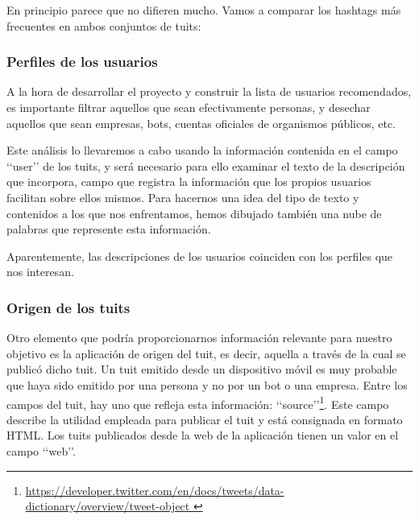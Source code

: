 En principio parece que no difieren mucho. Vamos a comparar los hashtags más frecuentes
en ambos conjuntos de tuits:


\subsubsection{Perfiles de los usuarios}
A la hora de desarrollar el proyecto y construir la lista de usuarios recomendados, es importante
filtrar aquellos que sean efectivamente personas, y desechar aquellos que sean empresas, bots, cuentas
oficiales de organismos públicos, etc.

Este análisis lo llevaremos a cabo usando la información contenida en el campo \lq\lq user\rq\rq
de los tuits, y será necesario para ello examinar el texto de la descripción que incorpora, campo que
registra la información que los propios usuarios facilitan sobre ellos mismos. 
Para hacernos una idea del tipo de texto y contenidos a los que nos enfrentamos, hemos dibujado también
una nube de palabras que represente esta información.




Aparentemente, las descripciones de los usuarios coinciden con los perfiles que nos interesan.

\subsubsection{Origen de los tuits}
\label{subsubsect:origen_tuits}
Otro elemento que podría proporcionarnos información relevante para nuestro objetivo
es la aplicación de origen del tuit, es decir, aquella a través de la
cual se publicó dicho tuit. Un tuit emitido desde un dispositivo móvil es muy
probable que haya sido emitido por una persona y no por un bot o una empresa. 
Entre los campos del tuit, hay uno que refleja esta información: \lq\lq source\rq\rq\footnote{
\url{https://developer.twitter.com/en/docs/tweets/data-dictionary/overview/tweet-object }}.
Este campo describe la utilidad empleada para publicar el tuit y 
está consignada en formato HTML. Los tuits publicados desde la web
de la aplicación tienen un valor en el campo \lq\lq web\rq\rq.

